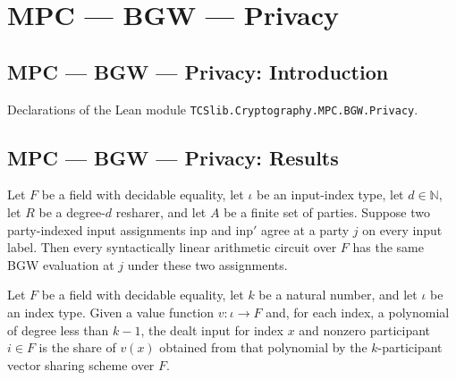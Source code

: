 \section{MPC --- BGW --- Privacy}
\subsection*{MPC --- BGW --- Privacy: Introduction}

Declarations of the Lean module \texttt{TCSlib.Cryptography.MPC.BGW.Privacy}.

\subsection*{MPC --- BGW --- Privacy: Results}

\begin{theorem}
\label{TCSlib.MPC.BGW.bgwEval_congr_of_isLinear}
\leanok
{}
Let $F$ be a field with decidable equality, let $\iota$ be an input-index type, let
$d\in\mathbb N$, let $R$ be a degree-$d$ resharer, and let $A$ be a finite set of
parties. Suppose two party-indexed input assignments $\mathrm{inp}$ and $\mathrm{inp}'$
agree at a party $j$ on every input label. Then every syntactically linear arithmetic
circuit over $F$ has the same BGW evaluation at $j$ under these two assignments.
\end{theorem}

\begin{definition}
\label{TCSlib.MPC.BGW.dealtInputs}
\leanok
{}
Let $F$ be a field with decidable equality, let $k$ be a natural number, and let $\iota$
be an index type. Given a value function $v:\iota\to F$ and, for each index, a
polynomial of degree less than $k-1$, the dealt input for index $x$ and nonzero
participant $i\in F$ is the share of $v(x)$ obtained from that polynomial by the
$k$-participant vector sharing scheme over $F$.
\end{definition}

